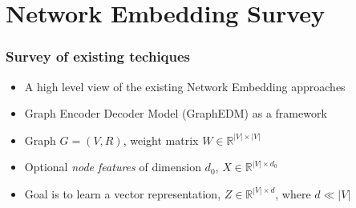 \documentclass{beamer}
\begin{document}
\section{Network Embedding Survey}
\begin{frame}
    \frametitle{Survey of existing techiques}

    \begin{itemize}
        \item A high level view of the existing Network Embedding approaches \cite{chami2020machine}
        \item Graph Encoder Decoder Model (GraphEDM) as a framework 
        \item Graph $G=(V,R)$, weight matrix $W\in \mathbb{R}^{|V|\times|V|}$
        \item Optional \textit{node features} of dimension $d_{0}$, $X \in \mathbb{R}^{|V|\times d_{0}}$
        \item Goal is to learn a vector representation, $Z \in \mathbb{R}^{|V|\times d}$, where $d \ll |V|$
    \end{itemize}
    
\end{frame}
\end{document}
